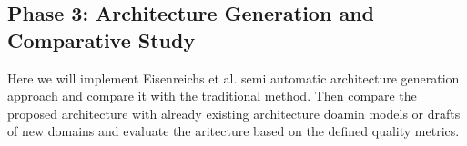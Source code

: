 \documentclass[12pt,a4paper]{article}
\begin{document}
\subsection{Phase 3: Architecture Generation and Comparative Study}
Here we will implement Eisenreichs et al. semi automatic architecture generation approach and compare it with the traditional method. Then compare the proposed architecture with already existing architecture doamin models or drafts of new domains and evaluate the aritecture based on the defined quality metrics.

\printbibliography
\end{document}
